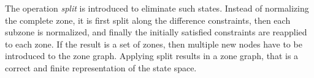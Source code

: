 
The operation \emph{split} \cite{bengtsson2004timed} is introduced to eliminate such states. Instead of
normalizing the complete zone, it is first split along the difference constraints,
then each subzone is normalized, and finally the initially satisfied constraints are reapplied to each zone. If the result is a set of zones, then multiple new nodes have to be introduced to the zone graph. Applying split results in a zone
graph, that is a correct and finite representation of the state space.







